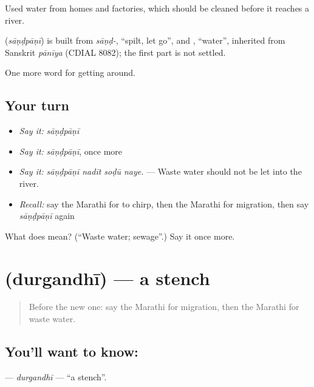 Used water from homes and factories, which should be cleaned before it reaches a river.

\begin{cousinweb}
\textbf{} (\emph{sāṇḍpāṇī}) is built from \emph{sāṇḍ-}, \textquotedblleft{}spilt, let go\textquotedblright{}, and \textbf{}, \textquotedblleft{}water\textquotedblright{}, inherited from Sanskrit \emph{pānīya} (CDIAL 8082); the first part is not settled.
\end{cousinweb}

\begin{grammarlens}[title={What you've built}]
One more word for getting around.
\end{grammarlens}

\subsection*{Your turn}
\begin{itemize}
\raggedright
  \item \emph{Say it:} \emph{sāṇḍpāṇī}
  \item \emph{Say it:} \emph{sāṇḍpāṇī}, once more
  \item \emph{Say it:} \emph{sāṇḍpāṇī nadīt soḍū naye.} — Waste water should not be let into the river.
  \item \emph{Recall:} say the Marathi for to chirp, then the Marathi for migration, then say \emph{sāṇḍpāṇī} again
\end{itemize}

\begin{tcolorbox}[breakable,colback=teal!4,colframe=teal!35!black,title={Before you move on}]
What does  mean? (\textquotedblleft{}Waste water; sewage\textquotedblright{}.) Say it once more.
\end{tcolorbox}
\section[\texorpdfstring{\mr{दुर्गंधी} (durgandhī)}{दुर्गंधी (durgandhī)}]{ (durgandhī) — a stench}

\label{lesson:MR-C448-durgandhi}



\begin{quote}
Before the new one: say the Marathi for migration, then the Marathi for waste water.
\end{quote}

\subsection*{You'll want to know: }
\textbf{} — \emph{durgandhī} — \textquotedblleft{}a stench\textquotedblright{}.

